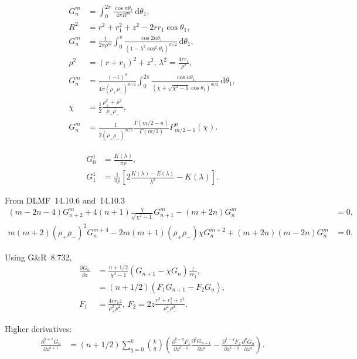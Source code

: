 \documentclass[a4paper,12pt]{article}
\newcommand{\D}{\mathrm{d}}
\begin{document}
\begin{align}
  G_{n}^{m}
  &=
  \int_{0}^{2\pi}
  \frac{\cos n\theta_{1}}{4\pi R^{m}}\,\D \theta_{1},\\
  R^{2} &= r^{2} + r_{1}^{2} + z^{2} - 2rr_{1}\cos\theta_{1},\\
  G_{n}^{m}
  &=
  \frac{1}{2\pi\rho^{m}}
  \int_{0}^{\pi}
  \frac{\cos 2n\theta_{1}}{(1 - \lambda^{2}\cos^{2}\theta_{1})^{m/2}}
  \,\D\theta_{1},\\
  \rho^{2} &= (r+r_{1})^{2} + z^{2},\,
  \lambda^{2} = \frac{4rr_{1}}{\rho^{2}},\\
  G_{n}^{m}
  &=
  \frac{(-1)^{n}}{4\pi(\rho_{+}\rho_{-})^{m/2}}
  \int_{0}^{2\pi}
  \frac{\cos n\theta_{1}}{(\chi + \sqrt{\chi^{2}-1}\cos\theta_{1})^{m/2}}
  \,\D\theta_{1},\\
  \chi &=
  \frac{1}{2}\frac{\rho_{+}^{2}+\rho_{-}^{2}}{\rho_{+}\rho_{-}},\\
  G_{n}^{m}
  &=
  \frac{1}{2(\rho_{+}\rho_{-})^{m/2}}
  \frac{\Gamma(m/2-n)}{\Gamma(m/2)}
  P_{m/2-1}^{n}(\chi).
\end{align}

\begin{align}
  G_{0}^{1} &= \frac{K(\lambda)}{\pi\rho},\\
  G_{1}^{1} &=
  \frac{1}{\pi\rho}
  \left[
    2
    \frac{K(\lambda) - E(\lambda)}{\lambda^{2}}
    -
    K(\lambda)
  \right].
\end{align}

From DLMF~14.10.6 and~14.10.3
\begin{align}
  (m-2n-4)G_{n+2}^{m} +
  4(n+1)\frac{\chi}{\sqrt{\chi^{2}-1}}G_{n+1}^{m} -
  (m+2n)G_{n}^{m} &= 0,\\
  m(m+2)(\rho_{+}\rho_{-})^{2}G_{n}^{m+4}
  -2m(m+1)(\rho_{+}\rho_{-})\chi G_{n}^{m+2}
  +(m+2n)(m-2n)G_{n}^{m} &= 0.
\end{align}

Using G\&R~8.732,
\begin{align}
  \frac{\partial G_{n}}{\partial z}
  &=
  \frac{n+1/2}{\chi^{2}-1}
  \left(
    G_{n+1} - \chi G_{n}
  \right)\frac{z}{rr_{1}},\\
  &=
  (n+1/2)
  \left(
    F_{1}G_{n+1} - F_{2}G_{n}
  \right),\\
  F_{1} &= \frac{4rr_{1}z}{\rho_{+}^{2}\rho_{-}^{2}},\,
  F_{2} = 2z\frac{r^{2} + r_{1}^{2} + z^{2}}{\rho_{+}^{2}\rho_{-}^{2}}.
\end{align}

Higher derivatives:
\begin{align}
  \frac{\partial^{k+1} G_{n}}{\partial z^{k+1}}
  &=
  (n+1/2)
  \sum_{q=0}^{k}
  \binom{k}{q}
  \left(
    \frac{\partial^{k-q}F_{1}}{\partial z^{k-q}}
    \frac{\partial^{q} G_{n+1}}{\partial z^{q}}
    -
    \frac{\partial^{k-q}F_{2}}{\partial z^{k-q}}
    \frac{\partial^{q} G_{n}}{\partial z^{q}}    
  \right).
\end{align}
\end{document}
